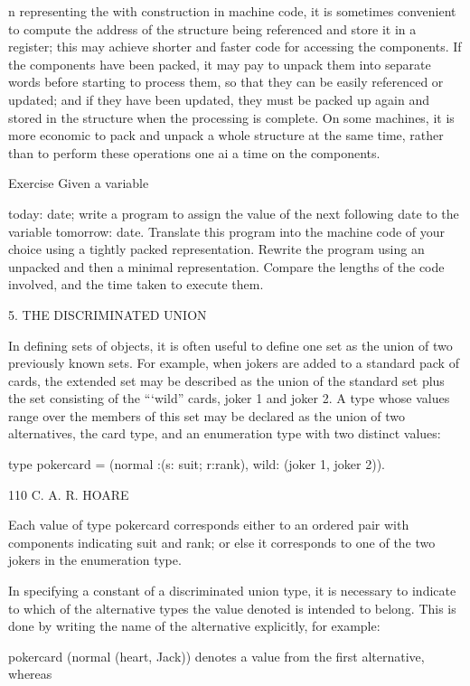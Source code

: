 {n representing the with construction in machine code, it is sometimes convenient to compute the address of the structure being referenced and store it in a register; this may achieve shorter and faster code for accessing the components. If the components have been packed, it may pay to unpack them into separate words before starting to process them, so that they can be easily referenced or updated; and if they have been updated, they must be packed up again and stored in the structure when the processing is complete. On some machines, it is more economic to pack and unpack a whole structure at the same time, rather than to perform these operations one ai a time on the components.
	
	Exercise Given a variable
	
	today: date; write a program to assign the value of the next following date to the variable tomorrow: date. Translate this program into the machine code of your choice using a tightly packed representation. Rewrite the program using an unpacked and then a minimal representation. Compare the lengths of the code involved, and the time taken to execute them.
	
	5. THE DISCRIMINATED UNION
	
	In defining sets of objects, it is often useful to define one set as the union of two previously known sets. For example, when jokers are added to a standard pack of cards, the extended set may be described as the union of the standard set plus the set consisting of the “‘wild” cards, joker 1 and joker 2. A type whose values range over the members of this set may be declared as the union of two alternatives, the card type, and an enumeration type with two distinct values:
	
	type pokercard = (normal :(s: suit; r:rank), wild: (joker 1, joker 2)).
	
	110 C. A. R. HOARE
	
	Each value of type pokercard corresponds either to an ordered pair with components indicating suit and rank; or else it corresponds to one of the two jokers in the enumeration type.
	
	In specifying a constant of a discriminated union type, it is necessary to indicate to which of the alternative types the value denoted is intended to belong. This is done by writing the name of the alternative explicitly, for example:
	
	pokercard (normal (heart, Jack)) denotes a value from the first alternative, whereas
	
}
